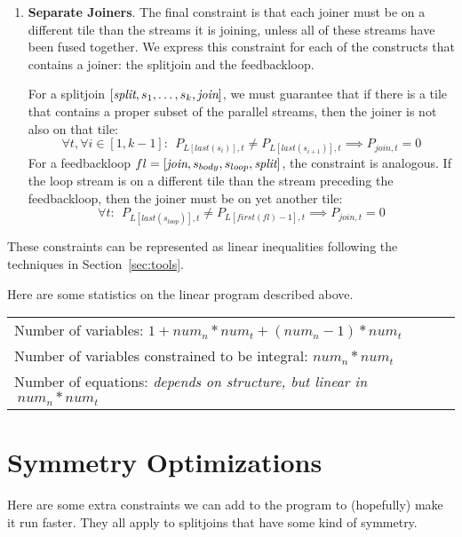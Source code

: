 \documentclass[12pt]{article}
\begin{document}
\begin{enumerate}
    \item {\bf Separate Joiners}.  The final constraint is that each
    joiner must be on a different tile than the streams it is joining,
    unless all of these streams have been fused together.  We express
    this constraint for each of the constructs that contains a joiner:
    the splitjoin and the feedbackloop.

    For a splitjoin $[\mbox{\it split}, s_1, \dots, s_k, \mbox{\it join}]$, we must
    guarantee that if there is a tile that contains a proper subset of
    the parallel streams, then the joiner is not also on that tile:
    \[
    \forall t, \forall i \in 
	    [1, k-1]:~~P_{L[last(s_i)],t} \ne P_{L[last(s_{i+1})],t}
	    \implies P_{join,t} = 0
    \]
    For a feedbackloop $fl = [\mbox{\it join}, s_{body}, s_{loop},
    \mbox{\it split}]$, the constraint is analogous.  If the loop stream is
    on a different tile than the stream preceding the feedbackloop,
    then the joiner must be on yet another tile:
    \[
    \forall t:~~P_{L[last(s_{loop})],t} \ne P_{L[first(fl)-1],t}
	    \implies P_{join,t} = 0
    \]

  \end{enumerate}

  These constraints can be represented as linear inequalities
  following the techniques in Section~\ref{sec:tools}.


  Here are some statistics on the linear program described above.

  \begin{tabular}{l} \\
    Number of variables: $1 + num_n * num_t + (num_n-1) * num_t$ \\
    Number of variables constrained to be integral: $num_n * num_t$ \\
    Number of equations: {\it depends on structure, but linear in}$~num_n * num_t$
  \end{tabular}

  \section{Symmetry Optimizations}

  Here are some extra constraints we can add to the program to
  (hopefully) make it run faster.  They all apply to splitjoins that
  have some kind of symmetry.
\end{document}
